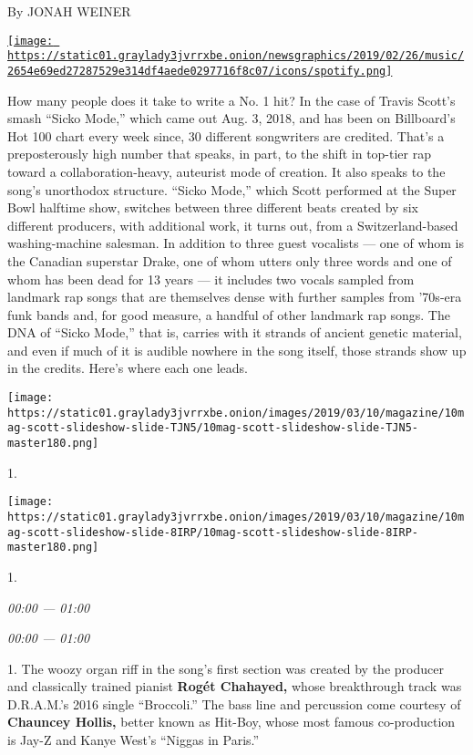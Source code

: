 By JONAH WEINER

\href{https://open.spotify.com/track/2xLMifQCjDGFmkHkpNLD9h}{\texttt{[image: https://static01.graylady3jvrrxbe.onion/newsgraphics/2019/02/26/music/2654e69ed27287529e314df4aede0297716f8c07/icons/spotify.png]}}

How many people does it take to write a No. 1 hit? In the case of Travis
Scott's smash ``Sicko Mode,'' which came out Aug. 3, 2018, and has been
on Billboard's Hot 100 chart every week since, 30 different songwriters
are credited. That's a preposterously high number that speaks, in part,
to the shift in top-tier rap toward a collaboration-heavy, auteurist
mode of creation. It also speaks to the song's unorthodox structure.
``Sicko Mode,'' which Scott performed at the Super Bowl halftime show,
switches between three different beats created by six different
producers, with additional work, it turns out, from a Switzerland-based
washing-machine salesman. In addition to three guest vocalists --- one
of whom is the Canadian superstar Drake, one of whom utters only three
words and one of whom has been dead for 13 years --- it includes two
vocals sampled from landmark rap songs that are themselves dense with
further samples from '70s-era funk bands and, for good measure, a
handful of other landmark rap songs. The DNA of ``Sicko Mode,'' that is,
carries with it strands of ancient genetic material, and even if much of
it is audible nowhere in the song itself, those strands show up in the
credits. Here's where each one leads.

\texttt{[image: https://static01.graylady3jvrrxbe.onion/images/2019/03/10/magazine/10mag-scott-slideshow-slide-TJN5/10mag-scott-slideshow-slide-TJN5-master180.png]}

1.

\texttt{[image: https://static01.graylady3jvrrxbe.onion/images/2019/03/10/magazine/10mag-scott-slideshow-slide-8IRP/10mag-scott-slideshow-slide-8IRP-master180.png]}

1.

\emph{00:00 --- 01:00}

\emph{00:00 --- 01:00}

1. The woozy organ riff in the song's first section was created by the
producer and classically trained pianist \textbf{Rogét Chahayed,} whose
breakthrough track was D.R.A.M.'s 2016 single ``Broccoli.'' The bass
line and percussion come courtesy of \textbf{Chauncey Hollis,} better
known as Hit-Boy, whose most famous co-production is Jay-Z and Kanye
West's ``Niggas in Paris.''

